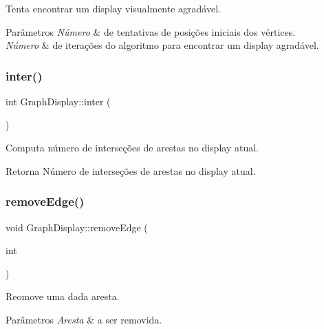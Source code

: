 Tenta encontrar um display visualmente agradável. 
\begin{DoxyParams}{Parâmetros}
{\em Número} & de tentativas de posições iniciais dos vértices. \\
\hline
{\em Número} & de iterações do algoritmo para encontrar um display agradável. \\
\hline
\end{DoxyParams}
\mbox{\label{classGraphDisplay_aa9300be5d20b62596cf709223a3dd67d}} 
\subsubsection{\texorpdfstring{inter()}{inter()}}
{\footnotesize\ttfamily int Graph\+Display\+::inter (\begin{DoxyParamCaption}{ }\end{DoxyParamCaption})}

Computa número de interseções de arestas no display atual. \begin{DoxyReturn}{Retorna}
Número de interseções de arestas no display atual. 
\end{DoxyReturn}
\mbox{\label{classGraphDisplay_adb5477315cf0e2435556c999a7c0cb8c}} 
\subsubsection{\texorpdfstring{remove\+Edge()}{removeEdge()}}
{\footnotesize\ttfamily void Graph\+Display\+::remove\+Edge (\begin{DoxyParamCaption}\item[{int}]{ }\end{DoxyParamCaption})}

Reomove uma dada aresta. 
\begin{DoxyParams}{Parâmetros}
{\em Aresta} & a ser removida. \\
\hline
\end{DoxyParams}
\mbox{\label{classGraphDisplay_adc84fa190931d2a2f73463ed211e0b71}} 
